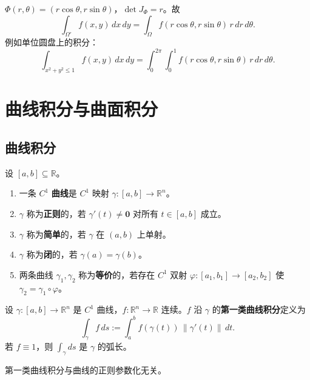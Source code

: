 \begin{example}[极坐标下的重积分]\label{ex:polar_integral}
$\Phi(r, \theta) = (r \cos\theta, r \sin\theta)$，$\det J_\Phi = r$。故
\[
\int_{\Omega'} f(x, y) \, dx \, dy = \int_{\Omega} f(r \cos\theta, r \sin\theta) \, r \, dr \, d\theta.
\]
例如单位圆盘上的积分：
\[
\int_{x^2 + y^2 \le 1} f(x, y) \, dx \, dy = \int_0^{2\pi} \int_0^1 f(r \cos\theta, r \sin\theta) \, r \, dr \, d\theta.
\]
\end{example}

\section{曲线积分与曲面积分}

\subsection{曲线积分}

\begin{definition}[曲线与参数化]\label{def:curve_parameterization}
设 $[a, b] \subseteq \mathbb{R}$。
\begin{enumerate}[label=(\roman*)]
    \item 一条 $C^1$ \textbf{曲线}是 $C^1$ 映射 $\gamma: [a, b] \to \mathbb{R}^n$。
    \item $\gamma$ 称为\textbf{正则}的，若 $\gamma'(t) \neq \mathbf{0}$ 对所有 $t \in [a, b]$ 成立。
    \item $\gamma$ 称为\textbf{简单}的，若 $\gamma$ 在 $(a, b)$ 上单射。
    \item $\gamma$ 称为\textbf{闭}的，若 $\gamma(a) = \gamma(b)$。
    \item 两条曲线 $\gamma_1, \gamma_2$ 称为\textbf{等价}的，若存在 $C^1$ 双射 $\varphi: [a_1, b_1] \to [a_2, b_2]$ 使 $\gamma_2 = \gamma_1 \circ \varphi$。
\end{enumerate}
\end{definition}

\begin{definition}\label{def:line_integral_first_kind}
设 $\gamma: [a, b] \to \mathbb{R}^n$ 是 $C^1$ 曲线，$f: \mathbb{R}^n \to \mathbb{R}$ 连续。$f$ 沿 $\gamma$ 的\textbf{第一类曲线积分}定义为
\[
\int_\gamma f \, ds := \int_a^b f(\gamma(t)) \, \|\gamma'(t)\| \, dt.
\]
若 $f \equiv 1$，则 $\int_\gamma ds$ 是 $\gamma$ 的弧长。
\end{definition}

\begin{proposition}[第一类曲线积分与参数化无关]\label{prop:line_integral_first_kind_invariance}
第一类曲线积分与曲线的正则参数化无关。
\end{proposition}

